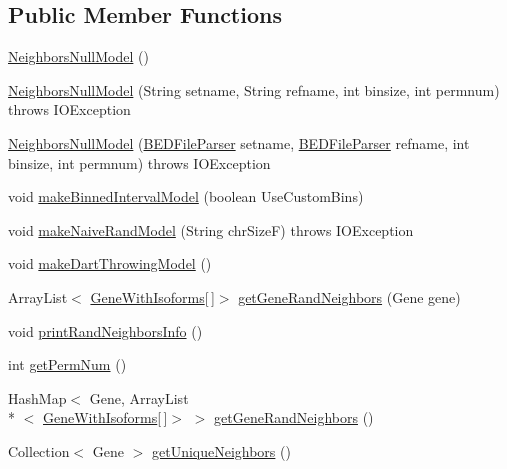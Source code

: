 \subsection*{Public Member Functions}
\begin{DoxyCompactItemize}
\item 
\hyperlink{classbroad_1_1pda_1_1gene_1_1_neighbors_null_model_a3a6dfc5bf8e80a0b41a8790d90b3b44b}{Neighbors\+Null\+Model} ()
\item 
\hyperlink{classbroad_1_1pda_1_1gene_1_1_neighbors_null_model_adb32ea3dab561da752840b5fdb8fdbe3}{Neighbors\+Null\+Model} (String setname, String refname, int binsize, int permnum)  throws I\+O\+Exception
\item 
\hyperlink{classbroad_1_1pda_1_1gene_1_1_neighbors_null_model_afa875f093ec7ab4473b118886d88a231}{Neighbors\+Null\+Model} (\hyperlink{classbroad_1_1pda_1_1annotation_1_1_b_e_d_file_parser}{B\+E\+D\+File\+Parser} setname, \hyperlink{classbroad_1_1pda_1_1annotation_1_1_b_e_d_file_parser}{B\+E\+D\+File\+Parser} refname, int binsize, int permnum)  throws I\+O\+Exception
\item 
void \hyperlink{classbroad_1_1pda_1_1gene_1_1_neighbors_null_model_a6597b985b4c7a6fe5be986f1d395fbf1}{make\+Binned\+Interval\+Model} (boolean Use\+Custom\+Bins)
\item 
void \hyperlink{classbroad_1_1pda_1_1gene_1_1_neighbors_null_model_a133ed88074e18109890f5b91d37ffaf9}{make\+Naive\+Rand\+Model} (String chr\+Size\+F)  throws I\+O\+Exception
\item 
void \hyperlink{classbroad_1_1pda_1_1gene_1_1_neighbors_null_model_a2134fae81a300acd93438baa11809dbe}{make\+Dart\+Throwing\+Model} ()
\item 
Array\+List$<$ \hyperlink{classbroad_1_1pda_1_1gene_1_1_gene_with_isoforms}{Gene\+With\+Isoforms}\mbox{[}$\,$\mbox{]}$>$ \hyperlink{classbroad_1_1pda_1_1gene_1_1_neighbors_null_model_ac1a835df4c21a06eaeeb92709f4d0c59}{get\+Gene\+Rand\+Neighbors} (Gene gene)
\item 
void \hyperlink{classbroad_1_1pda_1_1gene_1_1_neighbors_null_model_aab78061a983a5d98d7b07104cf2a1e40}{print\+Rand\+Neighbors\+Info} ()
\item 
int \hyperlink{classbroad_1_1pda_1_1gene_1_1_neighbors_null_model_afe164ab163e240d3c81cb05928de934a}{get\+Perm\+Num} ()
\item 
Hash\+Map$<$ Gene, Array\+List\\*
$<$ \hyperlink{classbroad_1_1pda_1_1gene_1_1_gene_with_isoforms}{Gene\+With\+Isoforms}\mbox{[}$\,$\mbox{]}$>$ $>$ \hyperlink{classbroad_1_1pda_1_1gene_1_1_neighbors_null_model_a51958d6e9c555183797899409b5ca00a}{get\+Gene\+Rand\+Neighbors} ()
\item 
Collection$<$ Gene $>$ \hyperlink{classbroad_1_1pda_1_1gene_1_1_neighbors_null_model_af5ac20d724aa6a95a38c47ffd71de94c}{get\+Unique\+Neighbors} ()
\end{DoxyCompactItemize}


